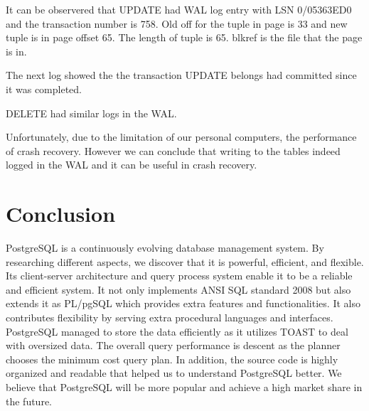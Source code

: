 \documentclass[a4paper]{article}
\begin{document}
It can be observered that UPDATE had WAL log entry with LSN 0/05363ED0 and the transaction number is 758. Old off for the tuple in page is 33 and new tuple is in page offset 65. The length of tuple is 65. blkref is the file that the page is in. 

The next log showed the the transaction UPDATE belongs had committed since it was completed.

DELETE had similar logs in the WAL.

Unfortunately, due to the limitation of our personal computers, the performance of crash recovery. However we can conclude that writing to the tables indeed logged in the WAL and it can be useful in crash recovery.
\section{Conclusion}
PostgreSQL is a continuously evolving database management system. By researching different aspects, we discover that it is powerful, efficient, and flexible. Its client-server architecture and query process system enable it to be a reliable and efficient system. It not only implements ANSI SQL standard 2008 but also extends it as PL/pgSQL which provides extra features and functionalities. It also contributes flexibility by serving extra procedural languages and interfaces. PostgreSQL managed to store the data efficiently as it utilizes TOAST to deal with oversized data. The overall query performance is descent as the planner chooses the minimum cost query plan. In addition, the source code is highly organized and readable that helped us to understand PostgreSQL better. We believe that PostgreSQL will be more popular and achieve a high market share in the future.
\clearpage
\end{document}
